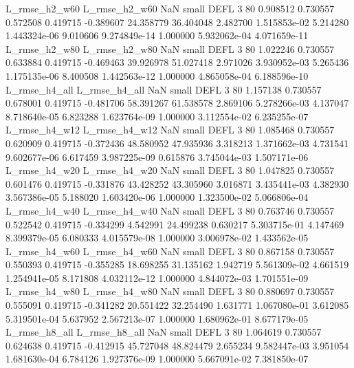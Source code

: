  L_rmse_h2_w60  L_rmse_h2_w60                   NaN      small     DEFL                 3 80 0.908512       0.730557 0.572508       0.419715   -0.389607     24.358779     36.404048     2.482700   1.515853e-02  5.214280 1.443324e-06     9.010606   9.274849e-14            1.000000    5.932062e-04        4.071659e-11
 L_rmse_h2_w80  L_rmse_h2_w80                   NaN      small     DEFL                 3 80 1.022246       0.730557 0.633884       0.419715   -0.469463     39.926978     51.027418     2.971026   3.930952e-03  5.265436 1.175135e-06     8.400508   1.442563e-12            1.000000    4.865058e-04        6.188596e-10
 L_rmse_h4_all  L_rmse_h4_all                   NaN      small     DEFL                 3 80 1.157138       0.730557 0.678001       0.419715   -0.481706     58.391267     61.538578     2.869106   5.278266e-03  4.137047 8.718640e-05     6.823288   1.623764e-09            1.000000    3.112554e-02        6.235255e-07
 L_rmse_h4_w12  L_rmse_h4_w12                   NaN      small     DEFL                 3 80 1.085468       0.730557 0.620909       0.419715   -0.372436     48.580952     47.935936     3.318213   1.371662e-03  4.731541 9.602677e-06     6.617459   3.987225e-09            0.615876    3.745044e-03        1.507171e-06
 L_rmse_h4_w20  L_rmse_h4_w20                   NaN      small     DEFL                 3 80 1.047825       0.730557 0.601476       0.419715   -0.331876     43.428252     43.305960     3.016871   3.435441e-03  4.382930 3.567386e-05     5.188020   1.603420e-06            1.000000    1.323500e-02        5.066806e-04
 L_rmse_h4_w40  L_rmse_h4_w40                   NaN      small     DEFL                 3 80 0.763746       0.730557 0.522542       0.419715   -0.334299      4.542991     24.499238     0.630217   5.303715e-01  4.147469 8.399379e-05     6.080333   4.015579e-08            1.000000    3.006978e-02        1.433562e-05
 L_rmse_h4_w60  L_rmse_h4_w60                   NaN      small     DEFL                 3 80 0.867158       0.730557 0.550393       0.419715   -0.355285     18.698255     31.135162     1.942719   5.561309e-02  4.661519 1.254941e-05     8.171808   4.032112e-12            1.000000    4.844072e-03        1.701551e-09
 L_rmse_h4_w80  L_rmse_h4_w80                   NaN      small     DEFL                 3 80 0.880697       0.730557 0.555091       0.419715   -0.341282     20.551422     32.254490     1.631771   1.067080e-01  3.612085 5.319501e-04     5.637952   2.567213e-07            1.000000    1.680962e-01        8.677179e-05
 L_rmse_h8_all  L_rmse_h8_all                   NaN      small     DEFL                 3 80 1.064619       0.730557 0.624638       0.419715   -0.412915     45.727048     48.824479     2.655234   9.582447e-03  3.951054 1.681630e-04     6.784126   1.927376e-09            1.000000    5.667091e-02        7.381850e-07
